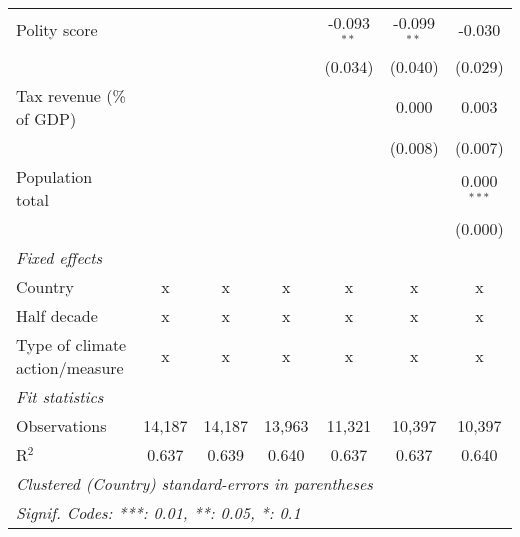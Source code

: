 \begin{tabular}{lcccccc}
   Polity score                                       &                &                &                & -0.093$^{**}$  & -0.099$^{**}$  & -0.030\\   
                                                      &                &                &                & (0.034)        & (0.040)        & (0.029)\\   
   Tax revenue (\% of GDP)                            &                &                &                &                & 0.000          & 0.003\\   
                                                      &                &                &                &                & (0.008)        & (0.007)\\   
   Population total                                   &                &                &                &                &                & 0.000$^{***}$\\   
                                                      &                &                &                &                &                & (0.000)\\   
   \emph{Fixed effects}\\
   Country                                            & x              & x              & x              & x              & x              & x\\  
   Half decade                                        & x              & x              & x              & x              & x              & x\\  
   Type of climate action/measure                     & x              & x              & x              & x              & x              & x\\  
   \midrule \emph{Fit statistics}\\
   Observations                                       & 14,187         & 14,187         & 13,963         & 11,321         & 10,397         & 10,397\\  
   R$^2$                                              & 0.637          & 0.639          & 0.640          & 0.637          & 0.637          & 0.640\\  
   \midrule
   \multicolumn{7}{l}{\emph{Clustered (Country) standard-errors in parentheses}}\\
   \multicolumn{7}{l}{\emph{Signif. Codes: ***: 0.01, **: 0.05, *: 0.1}}\\
\end{tabular}
\par\endgroup


